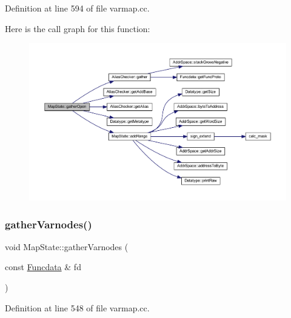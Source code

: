 Definition at line 594 of file varmap.\+cc.

Here is the call graph for this function\+:
\nopagebreak
\begin{figure}[H]
\begin{center}
\leavevmode
\includegraphics[width=350pt]{class_map_state_a43f627e6a51815b273f5dfbcc71ac605_cgraph}
\end{center}
\end{figure}
\mbox{\label{class_map_state_a83662d09d19a51e0ecbf8b09e63e9628}} 
\subsubsection{\texorpdfstring{gatherVarnodes()}{gatherVarnodes()}}
{\footnotesize\ttfamily void Map\+State\+::gather\+Varnodes (\begin{DoxyParamCaption}\item[{const \mbox{\hyperlink{class_funcdata}{Funcdata}} \&}]{fd }\end{DoxyParamCaption})}



Definition at line 548 of file varmap.\+cc.

